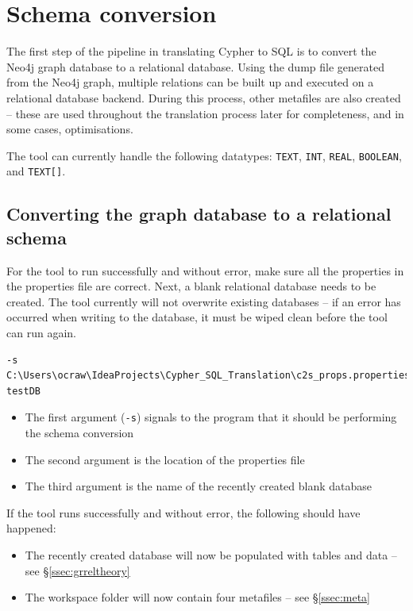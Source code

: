 \documentclass[letterpaper]{ltxdoc}
\begin{document}
\section{Schema conversion}
\label{sec:schemaConv}
The first step of the pipeline in translating Cypher to SQL is to convert the Neo4j graph database to a relational database. Using the dump file generated from the Neo4j graph, multiple relations can be built up and executed on a relational database backend. During this process, other metafiles are also created -- these are used throughout the translation process later for completeness, and in some cases, optimisations.

The tool can currently handle the following datatypes: \texttt{TEXT}, \texttt{INT}, \texttt{REAL}, \texttt{BOOLEAN}, and \texttt{TEXT[]}.


\subsection{Converting the graph database to a relational schema}
For the tool to run successfully and without error, make sure all the properties in the properties file are correct. Next, a blank relational database needs to be created. The tool currently will not overwrite existing databases -- if an error has occurred when writing to the database, it must be wiped clean before the tool can run again.

\medskip

\begin{verbatim}
-s C:\Users\ocraw\IdeaProjects\Cypher_SQL_Translation\c2s_props.properties testDB
\end{verbatim}

\medskip

\begin{itemize}
\item The first argument (\texttt{-s}) signals to the program that it should be performing the schema conversion
\item The second argument is the location of the properties file
\item The third argument is the name of the recently created blank database
\end{itemize}

\medskip

If the tool runs successfully and without error, the following should have happened:

\begin{itemize}
\item The recently created database will now be populated with tables and data -- see \S \ref{ssec:grreltheory}
\item The workspace folder will now contain four metafiles -- see \S \ref{ssec:meta}
\end{itemize}
\end{document}
